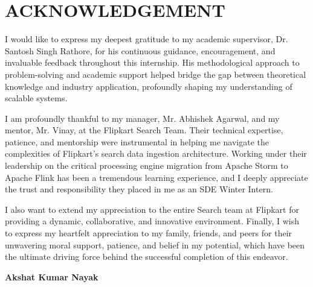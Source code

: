 \newpage
\section*{ACKNOWLEDGEMENT}

\begin{justify}
\noindent I would like to express my deepest gratitude to my academic supervisor, Dr. Santosh Singh Rathore, for his continuous guidance, encouragement, and invaluable feedback throughout this internship. His methodological approach to problem-solving and academic support helped bridge the gap between theoretical knowledge and industry application, profoundly shaping my understanding of scalable systems.

\noindent I am profoundly thankful to my manager, Mr. Abhishek Agarwal, and my mentor, Mr. Vinay, at the Flipkart Search Team. Their technical expertise, patience, and mentorship were instrumental in helping me navigate the complexities of Flipkart's search data ingestion architecture. Working under their leadership on the critical processing engine migration from Apache Storm to Apache Flink has been a tremendous learning experience, and I deeply appreciate the trust and responsibility they placed in me as an SDE Winter Intern.

\noindent I also want to extend my appreciation to the entire Search team at Flipkart for providing a dynamic, collaborative, and innovative environment. Finally, I wish to express my heartfelt appreciation to my family, friends, and peers for their unwavering moral support, patience, and belief in my potential, which have been the ultimate driving force behind the successful completion of this endeavor.
\end{justify}

\vspace{1cm}
\textbf{Akshat Kumar Nayak}\\